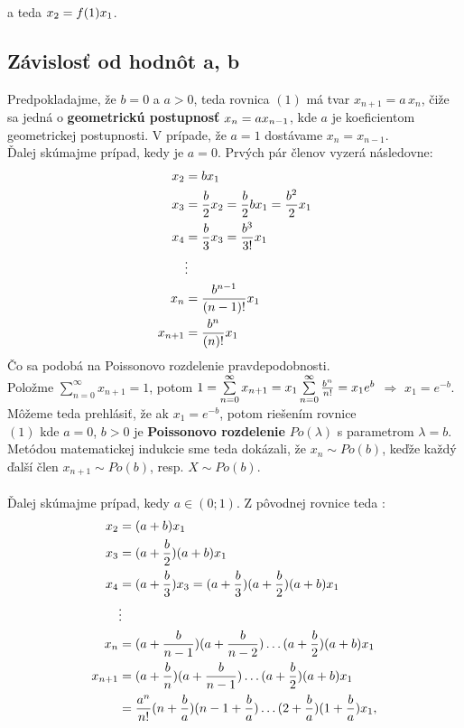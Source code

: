 \documentclass[a4paper,10pt]{article}
\theoremstyle{plain}
\theoremstyle{definition}
\begin{document}
\noindent a teda $ x_{2} = f(1)\*x_{1} $. 
\newpage
\subsection{Závislosť od hodnôt a, b}

Predpokladajme, že $ b=0 $ a $ a > 0 $, teda rovnica $ (1) $ má tvar $ x_{n+1} = a\,x_{n} $, čiže sa jedná o \textbf{geometrickú postupnosť}
$ x_{n} = a\*x_{n-1} $, kde $ a $ je koeficientom geometrickej postupnosti. V prípade, že $ a = 1 $ dostávame $ x_{n} = x_{n-1} $.
\\Ďalej skúmajme prípad, kedy je $ a=0 $. Prvých pár členov vyzerá následovne: 
\begin{align*}
x_{2}&=b\*x_{1}\\
x_{3}&=\frac{b}{2}\*x_{2} = \frac{b}{2}\*b\*x_{1}=\frac{b^{2}}{2}\*x_{1} \\
x_{4}&=\frac{b}{3}\*x_{3} = \frac{b^{3}}{3!}\*x_{1}  \\
&\vdots \\
x_{n}&=\frac{b^{n-1}}{(n-1)!}\*x_{1}    \\
x_{n+1}&=\frac{b^{n}}{(n)!}\*x_{1}   \\
\end{align*}
Čo sa podobá na Poissonovo rozdelenie pravdepodobnosti. \\
Položme $ \sum\limits_{n=0}^\infty x_{n+1} = 1 $, potom $ 1=\sum\limits_{n=0}^\infty x_{n+1} = x_{1}\*\sum\limits_{n=0}^\infty \frac{b^{n}}{n!} = x_{1}\*e^{b}$ $ \Rightarrow $ $ x_{1} = e^{-b} $.
Môžeme teda prehlásiť, že ak $x_{1}=e^{-b} $, potom riešením rovnice\\
$(1)$ kde $a=0$, $b>0$
je \textbf{Poissonovo rozdelenie} $Po(\lambda)$ s parametrom $\lambda=b$.\\
Metódou matematickej indukcie sme teda dokázali, že $x_{n}\sim Po(b)$, keďže každý ďalší člen $x_{n+1}\sim Po(b)$, resp. $ X \sim Po(b)$.\\
\\Ďalej skúmajme prípad, kedy $ a \in (0;1) $. Z pôvodnej rovnice teda :
\begin{align*}
x_{2}&=(a+b)\*x_{1} \\
x_{3}&=(a + \frac{b}{2}) \* (a + b)\*x_{1} \\
x_{4}&=(a + \frac{b}{3})\*x_{3}= (a + \frac{b}{3})\*(a + \frac{b}{2})\*(a + b)\*x_{1} \\
&\vdots \\
x_{n}&=(a + \frac{b}{n-1})\*(a + \frac{b}{n-2}) \ldots (a + \frac{b}{2})\*(a + b)\*x_{1}\\
x_{n+1}&=(a + \frac{b}{n})\*(a + \frac{b}{n-1}) \ldots (a + \frac{b}{2})\*(a + b)\*x_{1}\\
&=\frac{a^{n}}{n!}\*(n + \frac{b}{a})\*(n-1 + \frac{b}{a}) \ldots (2 + \frac{b}{a})\*(1 + \frac{b}{a})\*x_{1},
\end{align*}
\end{document}
